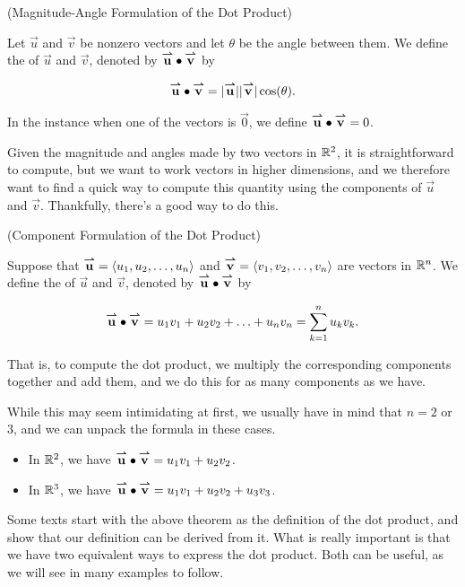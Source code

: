 \documentclass{ximera}
\begin{document}
\begin{definition} (Magnitude-Angle Formulation of the Dot Product)

Let $\vec{u}$ and $\vec{v}$ be nonzero vectors and let $\theta$ be the angle between them.  We define the  of $\vec{u}$ and $\vec{v}$, denoted by ${\overset{\boldsymbol{\rightharpoonup}}{\mathbf{u}}} \bullet {\overset{\boldsymbol{\rightharpoonup}}{\mathbf{v}}}$ by

\[
{\overset{\boldsymbol{\rightharpoonup}}{\mathbf{u}}} \bullet {\overset{\boldsymbol{\rightharpoonup}}{\mathbf{v}}} = |{\overset{\boldsymbol{\rightharpoonup}}{\mathbf{u}}}||{\overset{\boldsymbol{\rightharpoonup}}{\mathbf{v}}}|\cos(\theta).
\]

In the instance when one of the vectors is $\vec{0}$, we define ${\overset{\boldsymbol{\rightharpoonup}}{\mathbf{u}}} \bullet {\overset{\boldsymbol{\rightharpoonup}}{\mathbf{v}}} = 0$.
\end{definition}


Given the magnitude and angles made by two vectors in $\mathbb R^2$, it is straightforward to compute, but we want to work vectors in higher dimensions, and we therefore want to find a quick way to compute this quantity using the components of $\vec{u}$ and $\vec{v}$.  Thankfully, there's a good way to do this.

\begin{theorem} (Component Formulation of the Dot Product)

Suppose that ${\overset{\boldsymbol{\rightharpoonup}}{\mathbf{u}}} = \left\langle u_1,u_2,\ldots,u_n\right\rangle$ and ${\overset{\boldsymbol{\rightharpoonup}}{\mathbf{v}}} = \left\langle v_1,v_2,\ldots,v_n\right\rangle$ are vectors in $\mathbb R^n$.  We define the  of $\vec{u}$ and $\vec{v}$, denoted by ${\overset{\boldsymbol{\rightharpoonup}}{\mathbf{u}}} \bullet {\overset{\boldsymbol{\rightharpoonup}}{\mathbf{v}}}$ by

\[
{\overset{\boldsymbol{\rightharpoonup}}{\mathbf{u}}} \bullet {\overset{\boldsymbol{\rightharpoonup}}{\mathbf{v}}} = u_1v_1 +u_2v_2+ \ldots + u_nv_n = \sum_{k=1}^n u_kv_k.
\]

That is, to compute the dot product, we multiply the corresponding components together and add them, and we do this for as many components as we have.
\end{theorem}

While this may seem intimidating at first, we usually have in mind that $n=2$ or $3$, and we can unpack the formula in these cases.  

\begin{itemize}
\item In $\mathbb R^2$, we have ${\overset{\boldsymbol{\rightharpoonup}}{\mathbf{u}}} \bullet {\overset{\boldsymbol{\rightharpoonup}}{\mathbf{v}}} = u_1v_1+u_2v_2$.
\item In $\mathbb R^3$, we have ${\overset{\boldsymbol{\rightharpoonup}}{\mathbf{u}}} \bullet {\overset{\boldsymbol{\rightharpoonup}}{\mathbf{v}}} = u_1v_1+u_2v_2+u_3v_3$.
\end{itemize}

Some texts start with the above theorem as the definition of the dot product, and show that our definition can be derived from it.  What is really important is that we have two equivalent ways to express the dot product.  Both can be useful, as we will see in many examples to follow.
\end{document}
